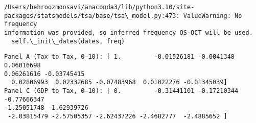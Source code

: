 \documentclass[11pt]{article}
\begin{document}
    \begin{Verbatim}[commandchars=\\\{\}]
/Users/behroozmoosavi/anaconda3/lib/python3.10/site-
packages/statsmodels/tsa/base/tsa\_model.py:473: ValueWarning: No frequency
information was provided, so inferred frequency QS-OCT will be used.
  self.\_init\_dates(dates, freq)
    \end{Verbatim}

    \begin{Verbatim}[commandchars=\\\{\}]
Panel A (Tax to Tax, 0–10): [ 1.         -0.01526181 -0.0041348   0.06016698
0.06261616 -0.03745415
  0.02806993  0.02332685 -0.07483968  0.01022276 -0.01345039]
Panel C (GDP to Tax, 0–10): [ 0.         -0.31441101 -0.17210344 -0.77666347
-1.25051748 -1.62939726
 -2.03815479 -2.57505357 -2.62437226 -2.4682777  -2.4885652 ]
    \end{Verbatim}

    \begin{center}
    \end{center}
    { \hspace*{\fill} \\}
    
\end{document}
